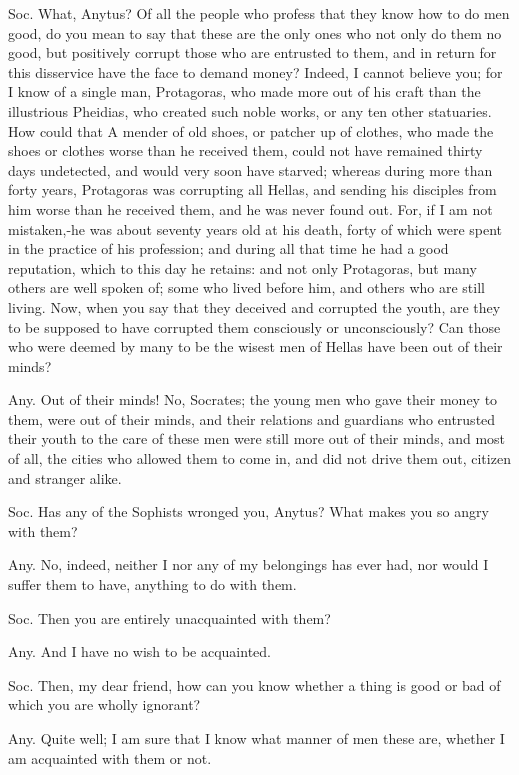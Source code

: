 Soc. What, Anytus? Of all the people who profess that they know how
to do men good, do you mean to say that these are the only ones who
not only do them no good, but positively corrupt those who are entrusted
to them, and in return for this disservice have the face to demand
money? Indeed, I cannot believe you; for I know of a single man, Protagoras,
who made more out of his craft than the illustrious Pheidias, who
created such noble works, or any ten other statuaries. How could that
A mender of old shoes, or patcher up of clothes, who made the shoes
or clothes worse than he received them, could not have remained thirty
days undetected, and would very soon have starved; whereas during
more than forty years, Protagoras was corrupting all Hellas, and sending
his disciples from him worse than he received them, and he was never
found out. For, if I am not mistaken,-he was about seventy years old
at his death, forty of which were spent in the practice of his profession;
and during all that time he had a good reputation, which to this day
he retains: and not only Protagoras, but many others are well spoken
of; some who lived before him, and others who are still living. Now,
when you say that they deceived and corrupted the youth, are they
to be supposed to have corrupted them consciously or unconsciously?
Can those who were deemed by many to be the wisest men of Hellas have
been out of their minds? 

Any. Out of their minds! No, Socrates; the young men who gave their
money to them, were out of their minds, and their relations and guardians
who entrusted their youth to the care of these men were still more
out of their minds, and most of all, the cities who allowed them to
come in, and did not drive them out, citizen and stranger alike.

Soc. Has any of the Sophists wronged you, Anytus? What makes you so
angry with them? 

Any. No, indeed, neither I nor any of my belongings has ever had,
nor would I suffer them to have, anything to do with them.

Soc. Then you are entirely unacquainted with them? 

Any. And I have no wish to be acquainted. 

Soc. Then, my dear friend, how can you know whether a thing is good
or bad of which you are wholly ignorant? 

Any. Quite well; I am sure that I know what manner of men these are,
whether I am acquainted with them or not. 

